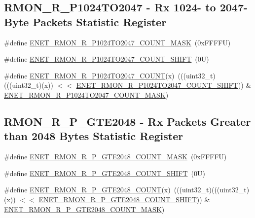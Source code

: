 \subsection*{R\+M\+O\+N\+\_\+\+R\+\_\+\+P1024\+T\+O2047 -\/ Rx 1024-\/ to 2047-\/\+Byte Packets Statistic Register}
\begin{DoxyCompactItemize}
\item 
\#define \mbox{\hyperlink{group___e_n_e_t___register___masks_ga9e6dbfdcd74c5b14ff7987973c952753}{E\+N\+E\+T\+\_\+\+R\+M\+O\+N\+\_\+\+R\+\_\+\+P1024\+T\+O2047\+\_\+\+C\+O\+U\+N\+T\+\_\+\+M\+A\+SK}}~(0x\+F\+F\+F\+F\+U)
\item 
\#define \mbox{\hyperlink{group___e_n_e_t___register___masks_gacf33c89b25640b4d44a0cc1a7e8ee178}{E\+N\+E\+T\+\_\+\+R\+M\+O\+N\+\_\+\+R\+\_\+\+P1024\+T\+O2047\+\_\+\+C\+O\+U\+N\+T\+\_\+\+S\+H\+I\+FT}}~(0\+U)
\item 
\#define \mbox{\hyperlink{group___e_n_e_t___register___masks_ga48a1c9b8f8ca8200a90af7f0b7948e27}{E\+N\+E\+T\+\_\+\+R\+M\+O\+N\+\_\+\+R\+\_\+\+P1024\+T\+O2047\+\_\+\+C\+O\+U\+NT}}(x)~(((uint32\+\_\+t)(((uint32\+\_\+t)(x)) $<$$<$ \mbox{\hyperlink{group___e_n_e_t___register___masks_gacf33c89b25640b4d44a0cc1a7e8ee178}{E\+N\+E\+T\+\_\+\+R\+M\+O\+N\+\_\+\+R\+\_\+\+P1024\+T\+O2047\+\_\+\+C\+O\+U\+N\+T\+\_\+\+S\+H\+I\+FT}})) \& \mbox{\hyperlink{group___e_n_e_t___register___masks_ga9e6dbfdcd74c5b14ff7987973c952753}{E\+N\+E\+T\+\_\+\+R\+M\+O\+N\+\_\+\+R\+\_\+\+P1024\+T\+O2047\+\_\+\+C\+O\+U\+N\+T\+\_\+\+M\+A\+SK}})
\end{DoxyCompactItemize}
\subsection*{R\+M\+O\+N\+\_\+\+R\+\_\+\+P\+\_\+\+G\+T\+E2048 -\/ Rx Packets Greater than 2048 Bytes Statistic Register}
\begin{DoxyCompactItemize}
\item 
\#define \mbox{\hyperlink{group___e_n_e_t___register___masks_gaf5df4a669f61146ee44ed2f49360b952}{E\+N\+E\+T\+\_\+\+R\+M\+O\+N\+\_\+\+R\+\_\+\+P\+\_\+\+G\+T\+E2048\+\_\+\+C\+O\+U\+N\+T\+\_\+\+M\+A\+SK}}~(0x\+F\+F\+F\+F\+U)
\item 
\#define \mbox{\hyperlink{group___e_n_e_t___register___masks_ga904cd13cbfecbb28ad3eb52c05fd3df0}{E\+N\+E\+T\+\_\+\+R\+M\+O\+N\+\_\+\+R\+\_\+\+P\+\_\+\+G\+T\+E2048\+\_\+\+C\+O\+U\+N\+T\+\_\+\+S\+H\+I\+FT}}~(0\+U)
\item 
\#define \mbox{\hyperlink{group___e_n_e_t___register___masks_gaa844aadcdf419a7c56585c6b46e08652}{E\+N\+E\+T\+\_\+\+R\+M\+O\+N\+\_\+\+R\+\_\+\+P\+\_\+\+G\+T\+E2048\+\_\+\+C\+O\+U\+NT}}(x)~(((uint32\+\_\+t)(((uint32\+\_\+t)(x)) $<$$<$ \mbox{\hyperlink{group___e_n_e_t___register___masks_ga904cd13cbfecbb28ad3eb52c05fd3df0}{E\+N\+E\+T\+\_\+\+R\+M\+O\+N\+\_\+\+R\+\_\+\+P\+\_\+\+G\+T\+E2048\+\_\+\+C\+O\+U\+N\+T\+\_\+\+S\+H\+I\+FT}})) \& \mbox{\hyperlink{group___e_n_e_t___register___masks_gaf5df4a669f61146ee44ed2f49360b952}{E\+N\+E\+T\+\_\+\+R\+M\+O\+N\+\_\+\+R\+\_\+\+P\+\_\+\+G\+T\+E2048\+\_\+\+C\+O\+U\+N\+T\+\_\+\+M\+A\+SK}})
\end{DoxyCompactItemize}
